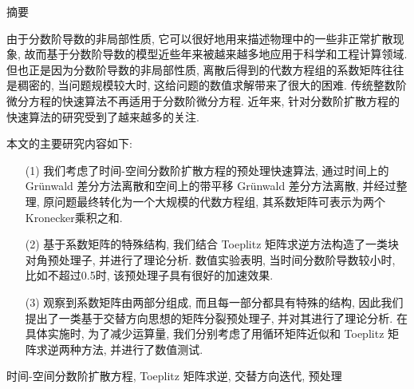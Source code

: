 \thispagestyle{plain}
{}

\centerline{\heiti 摘\quad 要}

\linespread{1.4} \bigskip
由于分数阶导数的非局部性质,
它可以很好地用来描述物理中的一些非正常扩散现象, 
故而基于分数阶导数的模型近些年来被越来越多地应用于科学和工程计算领域.
但也正是因为分数阶导数的非局部性质, 离散后得到的代数方程组的系数矩阵往往是稠密的,
当问题规模较大时, 这给问题的数值求解带来了很大的困难.
传统整数阶微分方程的快速算法不再适用于分数阶微分方程.
近年来, 针对分数阶扩散方程的快速算法的研究受到了越来越多的关注. 

本文的主要研究内容如下:
\begin{itemize}

\item[(1)] 
我们考虑了时间-空间分数阶扩散方程的预处理快速算法,
通过时间上的 Gr\"unwald 差分方法离散和空间上的带平移 Gr\"unwald 差分方法离散,
并经过整理, 原问题最终转化为一个大规模的代数方程组, 
其系数矩阵可表示为两个Kronecker乘积之和.
\medskip

\item[(2)]
基于系数矩阵的特殊结构, 我们结合 Toeplitz 
矩阵求逆方法构造了一类块对角预处理子, 并进行了理论分析.
数值实验表明, 当时间分数阶导数较小时, 比如不超过0.5时, 该预处理子具有很好的加速效果.
\medskip

\item[(3)]
观察到系数矩阵由两部分组成, 而且每一部分都具有特殊的结构,
因此我们提出了一类基于交替方向思想的矩阵分裂预处理子, 并对其进行了理论分析.
在具体实施时, 为了减少运算量, 我们分别考虑了用循环矩阵近似和
Toeplitz 矩阵求逆两种方法, 并进行了数值测试.

\end{itemize}

\bigskip

时间-空间分数阶扩散方程, Toeplitz 矩阵求逆, 交替方向迭代, 预处理